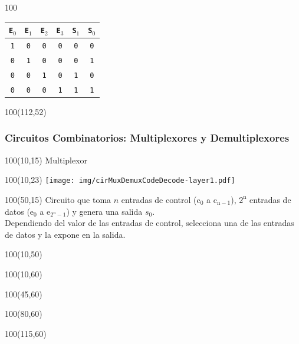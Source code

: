 \documentclass[aspectratio=169]{beamer}
\begin{document}
\begin{frame}[fragile]
\begin{textblock}{100}
{\begin{tabular}{|cccc|cc|}
    \small\texttt{E$_0$} & \small\texttt{E$_1$} & \small\texttt{E$_2$} & \small\texttt{E$_3$} & \small\texttt{S$_1$} & \small\texttt{S$_0$} \\ \hline
    \small\texttt{1}     & \small\texttt{0}     & \small\texttt{0}     & \small\texttt{0}     & \small\texttt{0}     & \small\texttt{0} \\
    \small\texttt{0}     & \small\texttt{1}     & \small\texttt{0}     & \small\texttt{0}     & \small\texttt{0}     & \small\texttt{1} \\
    \small\texttt{0}     & \small\texttt{0}     & \small\texttt{1}     & \small\texttt{0}     & \small\texttt{1}     & \small\texttt{0} \\
    \small\texttt{0}     & \small\texttt{0}     & \small\texttt{0}     & \small\texttt{1}     & \small\texttt{1}     & \small\texttt{1} \\ \hline
    \end{tabular} }
    \end{textblock}
    \begin{textblock}{100}(112,52)   \end{textblock}
\end{frame}

\begin{frame}[fragile]
    \frametitle{Circuitos Combinatorios: Multiplexores y Demultiplexores}
    \begin{textblock}{100}(10,15) Multiplexor \end{textblock}
    \begin{textblock}{100}(10,23) \texttt{[image: img/cirMuxDemuxCodeDecode-layer1.pdf]} \end{textblock}
    \begin{textblock}{100}(50,15)
    \small Circuito que toma $n$ entradas de control ($\mathrm{c_0}$ a $\mathrm{c_{n-1}}$), $\mathrm{2^n}$ entradas de datos ($\mathrm{e_0}$ a $\mathrm{e_{2^n-1}}$) y genera una salida $s_0$.\\
    \bigskip
    Dependiendo del valor de las entradas de control, selecciona una de las entradas de datos y la expone en la salida.
    \end{textblock}
    \begin{textblock}{100}(10,50)   \end{textblock}
    \begin{textblock}{100}(10,60)   \end{textblock}
    \begin{textblock}{100}(45,60)   \end{textblock}
    \begin{textblock}{100}(80,60)   \end{textblock}
    \begin{textblock}{100}(115,60)  \end{textblock}
\end{frame}
\end{document}
